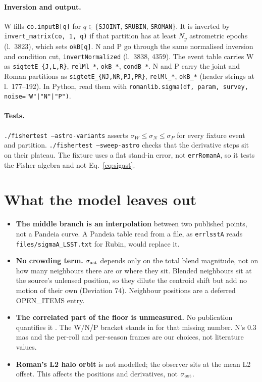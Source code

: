 \documentclass[english,10pt,a4paper]{article}
\newcommand{\code}[1]{\texttt{#1}}
\begin{document}
\paragraph{Inversion and output.}
W fills \code{co.inputB[q]} for $q\in\{$\code{SJOINT}, \code{SRUBIN}, \code{SROMAN}$\}$. It is
inverted by \code{invert\_matrix(co, 1, q)} if that partition has at least $N_y$ astrometric epochs
(l.~3823), which sets \code{okB[q]}. N and P go through the same normalised inversion and
condition cut, \code{invertNormalized} (l.~3838, 4359). The event table carries W as
\code{sigtetE\_\{J,L,R\}}, \code{relMl\_*}, \code{okB\_*}, \code{condB\_*}. N and P carry the
joint and Roman partitions as \code{sigtetE\_\{NJ,NR,PJ,PR\}}, \code{relMl\_*}, \code{okB\_*}
(header strings at l.~177--192). In Python, read them with \code{romanlib.sigma(df, param, survey,
noise="W"|"N"|"P")}.

\paragraph{Tests.}
\code{./fishertest --astro-variants} asserts $\sigma_W\le\sigma_N\le\sigma_P$ for every fixture
event and partition. \code{./fishertest --sweep-astro} checks that the derivative steps sit on their
plateau. The fixture uses a flat stand-in error, not \code{errRomanA}, so it tests the Fisher
algebra and not Eq.~\eqref{eq:sigast}.

\section{What the model leaves out}
\begin{itemize}
\item \textbf{The middle branch is an interpolation} between two published points, not a Pandeia
  curve. A Pandeia table read from a file, as \code{errlsstA} reads \code{files/sigmaA\_LSST.txt}
  for Rubin, would replace it.
\item \textbf{No crowding term.} $\sigma_{\rm ast}$ depends only on the total blend magnitude, not on
  how many neighbours there are or where they sit. Blended neighbours sit at the source's unlensed
  position, so they dilute the centroid shift but add no motion of their own (Deviation 74).
  Neighbour positions are a deferred OPEN\_ITEMS entry.
\item \textbf{The correlated part of the floor is unmeasured.} No publication quantifies it
  \citep{McKinnon2026RomanGaia}. The W/N/P bracket stands in for that missing number. N's 0.3\,mas
  and the per-roll and per-season frames are our choices, not literature values.
\item \textbf{Roman's L2 halo orbit} is not modelled; the observer sits at the mean L2 offset.
  This affects the positions and derivatives, not $\sigma_{\rm ast}$.
\end{itemize}



\end{document}
